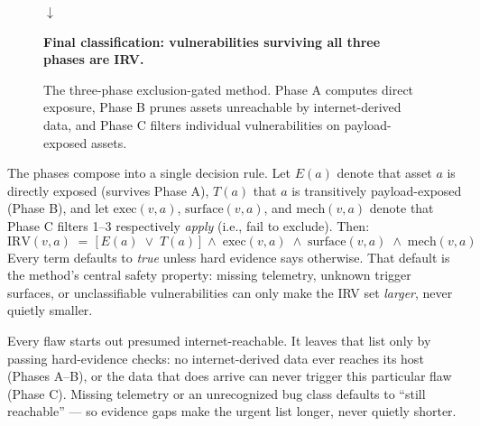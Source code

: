\documentclass[11pt]{article}
\begin{document}
\begin{figure}[H]
\begin{minipage}{0.92\textwidth}
\medskip $\downarrow$ \medskip


\medskip

\textbf{Final classification: vulnerabilities surviving all three phases are IRV.}
\end{minipage}
\caption{The three-phase exclusion-gated method. Phase A computes direct exposure, Phase B prunes assets unreachable by internet-derived data, and Phase C filters individual vulnerabilities on payload-exposed assets.}
\label{fig:phases}
\end{figure}

The phases compose into a single decision rule. Let $E(a)$ denote that asset $a$ is directly exposed (survives Phase A), $T(a)$ that $a$ is transitively payload-exposed (Phase B), and let $\mathrm{exec}(v,a)$, $\mathrm{surface}(v,a)$, and $\mathrm{mech}(v,a)$ denote that Phase C filters 1--3 respectively \emph{apply} (i.e., fail to exclude). Then:
\begin{equation}
\mathrm{IRV}(v,a) \;=\; \bigl[\,E(a) \;\lor\; T(a)\,\bigr] \;\land\; \mathrm{exec}(v,a) \;\land\; \mathrm{surface}(v,a) \;\land\; \mathrm{mech}(v,a)
\label{eq:decision}
\end{equation}
Every term defaults to \emph{true} unless hard evidence says otherwise. That default is the method's central safety property: missing telemetry, unknown trigger surfaces, or unclassifiable vulnerabilities can only make the IRV set \emph{larger}, never quietly smaller.

\begin{plain}
Every flaw starts out presumed internet-reachable. It leaves that list only by passing hard-evidence checks: no internet-derived data ever reaches its host (Phases A--B), or the data that does arrive can never trigger this particular flaw (Phase C). Missing telemetry or an unrecognized bug class defaults to ``still reachable'' --- so evidence gaps make the urgent list longer, never quietly shorter.
\end{plain}
\end{document}

